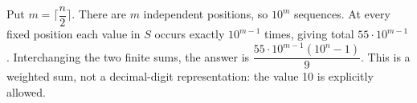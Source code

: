 Put $m=\lceil\dfrac{n}{2}\rceil$. There are $m$ independent positions, so $10^m$ sequences. At every fixed position each value in $S$ occurs exactly $10^{m-1}$ times, giving total $55\cdot10^{m-1}$. Interchanging the two finite sums, the answer is $\boxed{\dfrac{55\cdot10^{m-1}(10^n-1)}{9}}$. This is a weighted sum, not a decimal-digit representation: the value 10 is explicitly allowed.
